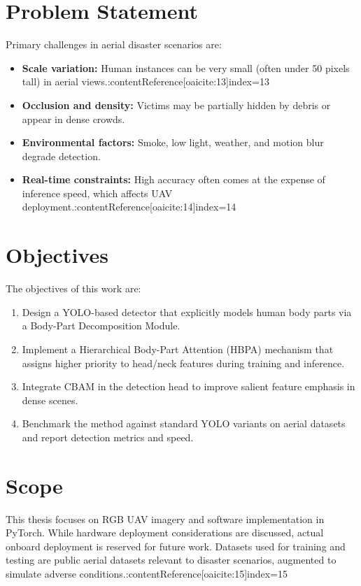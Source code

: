 \documentclass[12pt,a4paper]{report}
\begin{document}
\section{Problem Statement}
Primary challenges in aerial disaster scenarios are:
\begin{itemize}
  \item \textbf{Scale variation:} Human instances can be very small (often under 50 pixels tall) in aerial views.:contentReference[oaicite:13]{index=13}
  \item \textbf{Occlusion and density:} Victims may be partially hidden by debris or appear in dense crowds.
  \item \textbf{Environmental factors:} Smoke, low light, weather, and motion blur degrade detection.
  \item \textbf{Real-time constraints:} High accuracy often comes at the expense of inference speed, which affects UAV deployment.:contentReference[oaicite:14]{index=14}
\end{itemize}

\section{Objectives}
The objectives of this work are:
\begin{enumerate}
  \item Design a YOLO-based detector that explicitly models human body parts via a Body-Part Decomposition Module.
  \item Implement a Hierarchical Body-Part Attention (HBPA) mechanism that assigns higher priority to head/neck features during training and inference.
  \item Integrate CBAM in the detection head to improve salient feature emphasis in dense scenes.
  \item Benchmark the method against standard YOLO variants on aerial datasets and report detection metrics and speed.
\end{enumerate}

\section{Scope}
This thesis focuses on RGB UAV imagery and software implementation in PyTorch. While hardware deployment considerations are discussed, actual onboard deployment is reserved for future work. Datasets used for training and testing are public aerial datasets relevant to disaster scenarios, augmented to simulate adverse conditions.:contentReference[oaicite:15]{index=15}
\end{document}
